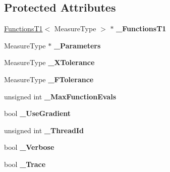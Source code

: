\subsection*{Protected Attributes}
\begin{DoxyCompactItemize}
\item 
\hypertarget{class_ox_1_1_fitter_afc5005541eb8ee1741faf3f7fef9f112}{\hyperlink{class_ox_1_1_functions_t1}{Functions\-T1}$<$ Measure\-Type $>$ $\ast$ {\bfseries \-\_\-\-Functions\-T1}}\label{class_ox_1_1_fitter_afc5005541eb8ee1741faf3f7fef9f112}

\item 
\hypertarget{class_ox_1_1_fitter_a508e5654aaf79dd744ec816d95b7e33c}{Measure\-Type $\ast$ {\bfseries \-\_\-\-Parameters}}\label{class_ox_1_1_fitter_a508e5654aaf79dd744ec816d95b7e33c}

\item 
\hypertarget{class_ox_1_1_fitter_af91a5ea8fb20072277ddcd64f5537b09}{Measure\-Type {\bfseries \-\_\-\-X\-Tolerance}}\label{class_ox_1_1_fitter_af91a5ea8fb20072277ddcd64f5537b09}

\item 
\hypertarget{class_ox_1_1_fitter_a926f6cf38998f041c31b079e93bf27ab}{Measure\-Type {\bfseries \-\_\-\-F\-Tolerance}}\label{class_ox_1_1_fitter_a926f6cf38998f041c31b079e93bf27ab}

\item 
\hypertarget{class_ox_1_1_fitter_a3be7ea1c1f19d3f4fb384474e2b1a033}{unsigned int {\bfseries \-\_\-\-Max\-Function\-Evals}}\label{class_ox_1_1_fitter_a3be7ea1c1f19d3f4fb384474e2b1a033}

\item 
\hypertarget{class_ox_1_1_fitter_a34c039e87d52c28b19092535a171264f}{bool {\bfseries \-\_\-\-Use\-Gradient}}\label{class_ox_1_1_fitter_a34c039e87d52c28b19092535a171264f}

\item 
\hypertarget{class_ox_1_1_fitter_a0d97d7a9c9fad0349484151464fefe4f}{unsigned int {\bfseries \-\_\-\-Thread\-Id}}\label{class_ox_1_1_fitter_a0d97d7a9c9fad0349484151464fefe4f}

\item 
\hypertarget{class_ox_1_1_fitter_a6457339f5252c85d7c92f20439544975}{bool {\bfseries \-\_\-\-Verbose}}\label{class_ox_1_1_fitter_a6457339f5252c85d7c92f20439544975}

\item 
\hypertarget{class_ox_1_1_fitter_a9ba79cb05ecc670254b3e7ddafc519ab}{bool {\bfseries \-\_\-\-Trace}}\label{class_ox_1_1_fitter_a9ba79cb05ecc670254b3e7ddafc519ab}

\end{DoxyCompactItemize}


